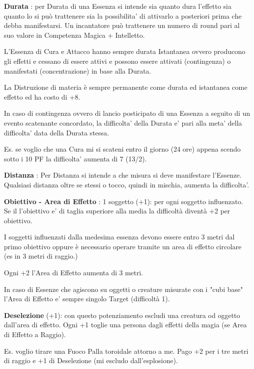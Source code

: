 \documentclass[a4paper,11pt,twoside,openany]{book}
\begin{document}
\bigskip

\textbf{Durata} : per Durata di una Essenza si intende sia quanto dura l'effetto sia quanto lo si può trattenere sia la possibilita' di attivarlo a posteriori prima che debba manifestarsi. Un incantatore può trattenere un numero di round pari al suo valore in Competenza Magica + Intelletto.

L'Essenza di Cura e Attacco hanno sempre durata Istantanea ovvero producono gli effetti e cessano di essere attivi e possono essere attivati (contingenza) o manifestati (concentrazione) in base alla Durata.

La Distruzione di materia è sempre permanente come durata ed istantanea come effetto ed ha costo di +8.

In caso di contingenza ovvero di lancio posticipato di una Essenza a seguito di un evento scatenante concordato, la difficolta' della Durata e' pari alla meta' della difficolta' data della Durata stessa.

Es. se voglio che una Cura mi si scateni entro il giorno (24 ore) appena scendo sotto i 10 PF la difficolta' aumenta di 7 (13/2).


\textbf{Distanza} : Per Distanza si intende a che misura si deve manifestare l'Essenze.
Qualsiasi distanza oltre se stessi o tocco, quindi in mischia, aumenta la difficolta'.


\textbf{Obiettivo - Area di Effetto} : 1 soggetto (+1): per ogni soggetto influenzato. Se il l'obiettivo e' di taglia superiore alla media la difficoltà diventà +2 per obiettivo.

I soggetti influenzati dalla medesima essenza devono essere entro 3 metri dal primo obiettivo oppure è necessario operare tramite un area di effetto circolare (es in 3 metri di raggio.)

Ogni +2 l'Area di Effetto aumenta di 3 metri.

In caso di Essenze che agiscono su oggetti o creature misurate con i "cubi base" l'Area di Effetto e' sempre singolo Target (difficoltà 1).


\textbf{Deselezione} (+1): con questo potenziamento escludi una creatura od oggetto dall'area di  effetto. Ogni +1 toglie una persona dagli effetti della magia (se Area di Effetto a Raggio).

Es. voglio tirare una Fuoco Palla toroidale attorno a me. Pago +2 per i tre metri di raggio e +1 di Deselezione (mi escludo dall'esplosione).
\end{document}
